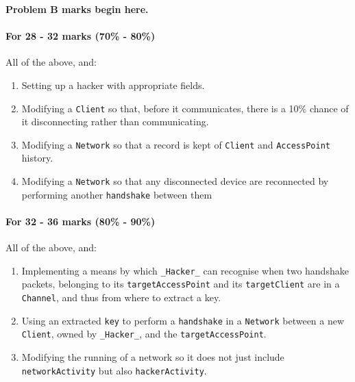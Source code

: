 \documentclass[11pt]{article}
\begin{document}
\textbf{Problem B marks begin here.}
				
\paragraph{For 28 -  32 marks (70\% - 80\%)}
			
			All of the above, and:  \begin{enumerate}
			
				\item Setting up a hacker with appropriate fields.
				
				\item Modifying a \texttt{Client} so that, before it communicates, there is a 10\% chance of it disconnecting rather than communicating.
				
				\item Modifying a \texttt{Network} so that a record is kept of \texttt{Client} and \texttt{AccessPoint} history.
				
				\item Modifying a \texttt{Network} so that any disconnected device are reconnected by performing another \texttt{handshake} between them			 
				
			\end{enumerate}

\paragraph{For 32 -  36 marks (80\% - 90\%)}
			
			All of the above, and:  \begin{enumerate}
				
				\item Implementing a means by which \texttt{_Hacker_} can recognise when two handshake packets, belonging to its \texttt{targetAccessPoint} and its \texttt{targetClient} are in a \texttt{Channel}, and thus from where to extract a key.
				
				\item Using an extracted \texttt{key} to perform a \texttt{handshake} in a \texttt{Network} between a new \texttt{Client}, owned by \texttt{_Hacker_}, and the \texttt{targetAccessPoint}.
				
				\item Modifying the running of a network so it does not just include \texttt{networkActivity} but also \texttt{hackerActivity}.
			
			\end{enumerate}
							     
\end{document}
